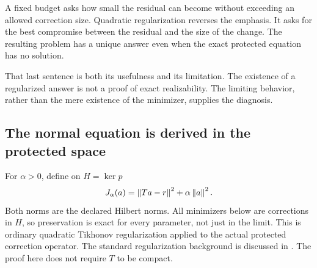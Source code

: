 \clearpage
{}\label{sec:regularized-repair}
A fixed budget asks how small the residual can become without exceeding an allowed correction size. Quadratic regularization reverses the emphasis. It asks for the best compromise between the residual and the size of the change. The resulting problem has a unique answer even when the exact protected equation has no solution.

That last sentence is both its usefulness and its limitation. The existence of a regularized answer is not a proof of exact realizability. The limiting behavior, rather than the mere existence of the minimizer, supplies the diagnosis.

\subsection{The normal equation is derived in the protected space}
For $\alpha>0$, define on $H=\ker p$
\[
 J_\alpha(a)=\left\lVert Ta-r\right\rVert^2+\alpha\left\lVert a\right\rVert^2.
\]
Both norms are the declared Hilbert norms. All minimizers below are corrections in $H$, so preservation is exact for every parameter, not just in the limit. This is ordinary quadratic Tikhonov regularization applied to the actual protected correction operator. The standard regularization background is discussed in \cite{clason-inverse}. The proof here does not require $T$ to be compact.


